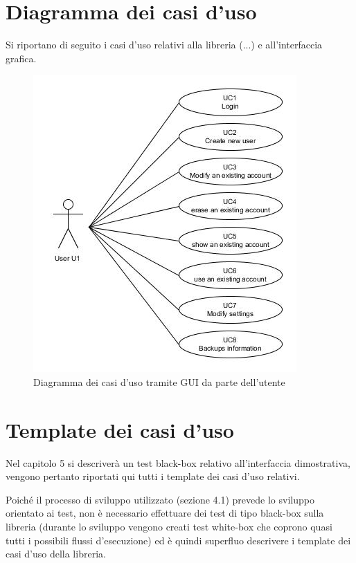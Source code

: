 \documentclass[a4paper,10pt]{report} %
\begin{document}
  \section{Diagramma dei casi d'uso}
    Si riportano di seguito i casi d'uso relativi alla libreria (...) e all'interfaccia grafica.
		\begin{figure}[htbp]
			\centering
			\includegraphics[scale = 0.5]{immagini/USE_CASE_DIAGRAM-UMLet.jpg}
			\caption{Diagramma dei casi d'uso tramite GUI da parte dell'utente}
			\end{figure}
  \section{Template dei casi d'uso}
		Nel capitolo 5 si descriverà un test black-box relativo all’interfaccia dimostrativa,
			vengono pertanto riportati qui tutti i template dei casi d’uso relativi.

		Poiché il processo di sviluppo utilizzato (sezione 4.1) prevede lo sviluppo orientato ai test,
			non è necessario effettuare dei test di tipo black-box sulla libreria
			(durante lo sviluppo vengono creati test white-box che coprono quasi tutti i possibili flussi d’esecuzione)
			ed è quindi superfluo descrivere i template dei casi d’uso della libreria.
\end{document}
